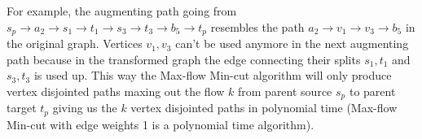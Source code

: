 \documentclass{imports}
\begin{document}
    For example, the augmenting path going from $s_p \to a_2 \to s_1 \to t_1 \to s_3 \to t_3 \to b_5 \to t_p$ resembles the path
    $a_2 \to v_1 \to v_3 \to b_5$ in the original graph. Vertices $v_1, v_3$ can't be used anymore in the next augmenting path because in the transformed
    graph the edge connecting their splits $s_1, t_1$ and $s_3, t_3$ is used up. This way the Max-flow Min-cut algorithm will only produce 
    vertex disjointed paths maxing out the flow $k$ from parent source $s_p$ to parent target $t_p$ giving us the $k$ vertex disjointed paths in polynomial time 
    (Max-flow Min-cut with edge weights 1 is a polynomial time algorithm).\vspace{10pt}



    \vspace{10pt}
    \cite{team}
    \newpage
    
    
\end{document}
